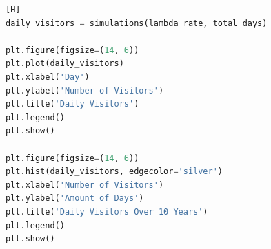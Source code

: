 \documentclass{article}
\begin{document}
\begin{lstlisting}[language=Python][H]
daily_visitors = simulations(lambda_rate, total_days)

plt.figure(figsize=(14, 6))
plt.plot(daily_visitors)
plt.xlabel('Day')
plt.ylabel('Number of Visitors')
plt.title('Daily Visitors')
plt.legend()
plt.show()

plt.figure(figsize=(14, 6))
plt.hist(daily_visitors, edgecolor='silver')
plt.xlabel('Number of Visitors')
plt.ylabel('Amount of Days')
plt.title('Daily Visitors Over 10 Years')
plt.legend()
plt.show()
\end{lstlisting}



\end{document}
